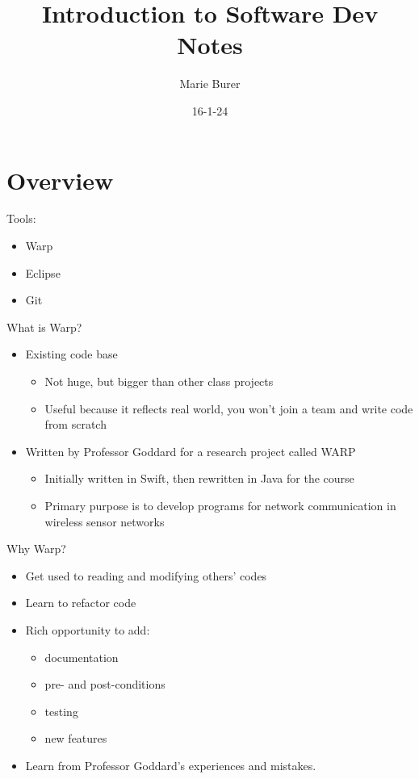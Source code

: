 \documentclass[12pt]{article}
\title{Introduction to Software Dev Notes}
\author{Marie Burer}
\date{16-1-24}
\begin{document}
\maketitle
\newpage
\setlength{\parindent}{0pt}
\tableofcontents

\newpage

\section{Overview}

Tools:
\begin{itemize}
    \item Warp
    \item Eclipse
    \item Git
\end{itemize}
What is Warp?

\begin{itemize}
    \item Existing code base
    \begin{itemize}
        \item Not huge, but bigger than other class projects
        \item Useful because it reflects real world, you won't join a team and write code from scratch
    \end{itemize}

    \item Written by Professor Goddard for a research project called WARP
    \begin{itemize}
        \item Initially written in Swift, then rewritten in Java for the course
        \item Primary purpose is to develop programs for network communication in wireless sensor networks
    \end{itemize}
\end{itemize}
Why Warp?

\begin{itemize}
    \item Get used to reading and modifying others' codes
    \item Learn to refactor code
    \item Rich opportunity to add:
    \begin{itemize}
        \item documentation
        \item pre- and post-conditions
        \item testing
        \item new features
    \end{itemize}
    \item Learn from Professor Goddard's experiences and mistakes.
\end{itemize}
\end{document}
